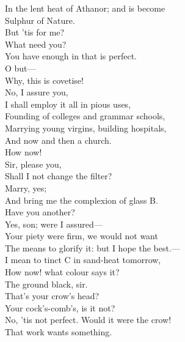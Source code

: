 \documentclass[a4paper,oneside,12pt]{memoir}
\begin{document}
\begin{drama*}
In the lent heat of Athanor; and is become\\
Sulphur of Nature.\\
\mammonspeaks {} But 'tis for me?\\
\subtlespeaks {} What need you?\\
You have enough in that is perfect.\\
\mammonspeaks {} O but---\\
\subtlespeaks Why, this is covetise!\\
\mammonspeaks {} No, I assure you,\\
I shall employ it all in pious uses,\\
Founding of colleges and grammar schools,\\
Marrying young virgins, building hospitals,\\
And now and then a church.\\
\subtlespeaks {} How now!\\
\facespeaks {} Sir, please you,\\
Shall I not change the filter?\\
\subtlespeaks {} Marry, yes;\\
And bring me the complexion of glass B.\\
\mammonspeaks Have you another?\\
\subtlespeaks {} Yes, son; were I assured---\\
Your piety were firm, we would not want\\
The means to glorify it: but I hope the best.---\\
I mean to tinct C in sand-heat tomorrow,\\
How now! what colour says it?\\
\facespeaks {} The ground black, sir.\\
\mammonspeaks That's your crow's head?\\
\surlyspeaks {} Your cock's-comb's, is it not?\\
\subtlespeaks No, 'tis not perfect. Would it were the crow!\\
That work wants something.\\

\end{drama*}
\end{document}
